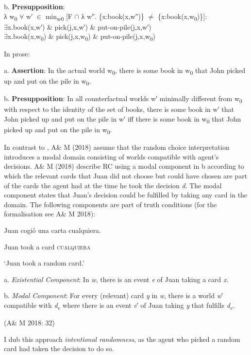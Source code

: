 \documentclass[output=paper]{langscibook}
\begin{document}
  b.  \textbf{Presupposition}: \\
λ w\textsubscript{0} ${\forall}$ w′ ${\in}$ min\textsubscript{w0} [F ${\cap}$ λ w″. \{x:book(x,w″)\} ${\neq}$ \{x:book(x,w\textsubscript{0})\}]:\\
${\exists}$x.book(x,w′) \& pick(j,x,w′) \& put-on-pile(j,x,w′)\\
${\exists}$x.book(x,w\textsubscript{0}) \& pick(j,x,w\textsubscript{0}) \& put-on-pile(j,x,w\textsubscript{0})

In prose:

  a.  \textbf{Assertion}: In the actual world w\textsubscript{0}, there is some book in w\textsubscript{0} that John picked up and put on the pile in w\textsubscript{0}.

  b.  \textbf{Presupposition}: In all counterfactual worlds w′ minimally different from w\textsubscript{0} with respect to the identity of the set of books, there is some book in w′ that John picked up and put on the pile in w′ iff there is some book in w\textsubscript{0} that John picked up and put on the pile in w\textsubscript{0}.

In contrast to \citealt{ChoiRomero2008}, A\& M (2018) assume that the random choice interpretation introduces a modal domain consisting of worlds compatible with agent’s decisions. A\& M (2018) describe RC using a modal component in b according to which the relevant cards that Juan did not choose but could have chosen are part of the cards the agent had at the time he took the decision \textit{d}. The modal component states that Juan’s decision could be fulfilled by taking any card in the domain. The following components are part of truth conditions (for the formalisation see A\& M 2018):

    Juan  cogió  una  carta  cualquiera.

    Juan  took  a  card \textsc{cualquiera}

    ‘Juan took a random card.’

\label{bkm:Ref150779122}  a.  \textit{Existential Component}: In \textit{w}, there is an event \textit{e} of Juan taking a card \textit{x}.

  b.  \textit{Modal Component}: For every (relevant) card \textit{y} in \textit{w}, there is a world \textit{w}′ compatible with \textit{d\textsubscript{e}} where there is an event \textit{e}′ of Juan taking \textit{y} that fulfills \textit{d\textsubscript{e}}.

    (A\& M 2018: 32)

I dub this approach \textit{intentional randomness}, as the agent who picked a random card had taken the decision to do so. 
\end{document}
